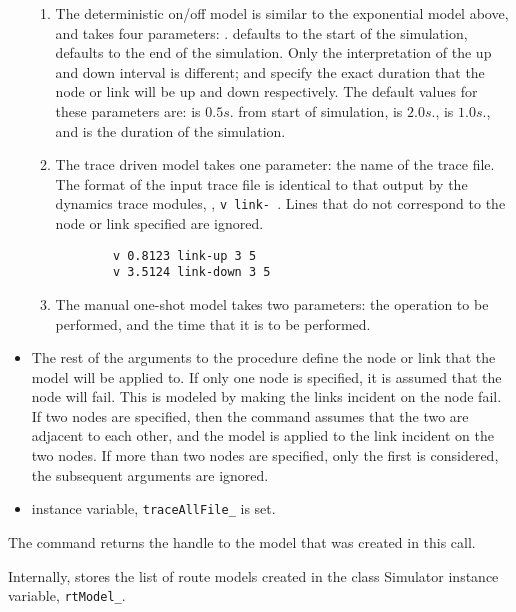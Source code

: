 \begin{list}{---}{}
\begin{itemize}
\begin{enumerate}
\item The deterministic on/off model
is similar to the exponential model above, and  takes four parameters:
.
 defaults to the start of the simulation,
 defaults to the end of the simulation.
Only the interpretation of the up and down interval is different;
 and  specify the exact duration
that the node or link will be up and down respectively.
The default values for these parameters are:
 is $0.5s.$ from start of simulation,
 is $2.0s.$,
 is $1.0s.$, and
 is the duration of the simulation.
\item The trace driven model takes one parameter:
the name of the trace file.
The format of the input trace file is identical to that 
output by the dynamics trace modules, \viz,
{\tt v  link-  }.
Lines that do not correspond to the node or link specified are ignored.
{\small
\begin{verbatim}
        v 0.8123 link-up 3 5
        v 3.5124 link-down 3 5
\end{verbatim}
}
\item The manual one-shot model takes two parameters:
the operation to be performed, and the time that it is to be
performed.
\end{enumerate}

\item %
The rest of the arguments to the  procedure
define the node or link that the model will be applied to.
If only one node is specified,
it is assumed that the node will fail.
This is modeled by making the links incident on the node fail.
If two nodes are specified, then the command assumes that
the two are adjacent to each other, and the model is applied to the
link incident on the two nodes.
If more than two nodes are specified, only the first is considered,
the subsequent arguments are ignored.

\item %
  instance variable, {\tt traceAllFile\_} is set.
\end{itemize}
The command returns the handle to the model that was created in this call.

Internally,  stores the list of route models created
in the class Simulator instance variable, {\tt rtModel\_}.


\end{list}
